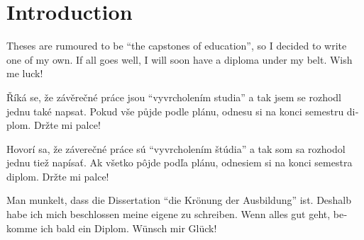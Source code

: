 \documentclass[
  digital,     %
  oneside,     %
  nosansbold,  %
  nocolorbold, %
  lof,         %
  lot,         %
]{fithesis4}
\begin{document}
\chapter*{Introduction}

Theses are rumoured to be \enquote{the capstones of education}, so
I decided to write one of my own. If all goes well, I will soon
have a diploma under my belt. Wish me luck!

\begin{otherlanguage}{czech}
Říká se, že závěrečné práce jsou \enquote{vyvrcholením studia}
a tak jsem se rozhodl jednu také napsat. Pokud vše půjde podle
plánu, odnesu si na konci semestru diplom. Držte mi palce!
\end{otherlanguage}

\begin{otherlanguage}{slovak}
Hovorí sa, že záverečné práce sú \enquote{vyvrcholením štúdia}
a tak som sa rozhodol jednu tiež napísať. Ak všetko pôjde podľa
plánu, odnesiem si na konci semestra diplom. Držte mi palce!
\end{otherlanguage}

\begin{otherlanguage}{german}
Man munkelt, dass die Dissertation \enquote{die Krönung der
Ausbildung} ist. Deshalb habe ich mich beschlossen meine eigene
zu schreiben. Wenn alles gut geht, bekomme ich bald ein Diplom.
Wünsch mir Glück!
\end{otherlanguage}
\end{document}
